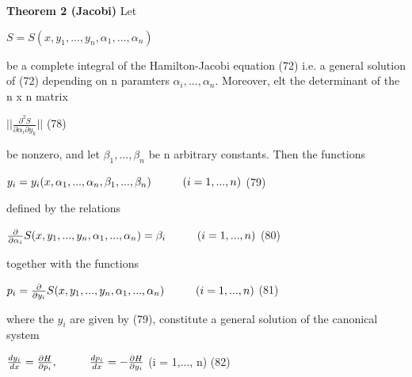 \documentclass{article}
\newcommand\tab[1][1cm]{\hspace*{#1}}
\begin{document}
\textbf {Theorem 2 (Jacobi)} Let
\begin{center}
$S = S(x, y_1 ,..., y_n, \alpha_1 ,..., \alpha_n)$
\end{center}
be a complete integral of the Hamilton-Jacobi equation (72) i.e. a general solution of (72) depending on n paramters $\alpha_i ,..., \alpha_n$. Moreover, elt the determinant of the n x n matrix
\begin{center}
$||\frac{\partial^2 S}{\partial \alpha_i \partial y_k} ||$ \tab (78)
\end{center}
be nonzero, and let $\beta_1 ,..., \beta_n$ be n arbitrary constants. Then the functions
\begin{center}
$y_i = y_i (x, \alpha_1 ,..., \alpha_n , \beta_1 ,..., \beta_n) \tab (i = 1,..., n)$ \tab (79)
\end{center}
defined by the relations
\begin{center}
$\frac{\partial}{\partial \alpha_i} S(x, y_1 ,..., y_n, \alpha_1 ,..., \alpha_n) = \beta_i \tab (i = 1,...,n)$ \tab (80)
\end{center}
together with the functions
\begin{center}
$p_i = \frac{\partial}{\partial y_i} S(x, y_1 ,..., y_n, \alpha_1 ,..., \alpha_n) \tab (i = 1,..., n)$ \tab (81)
\end{center}
where the $y_i$ are given by (79), constitute a general solution of the canonical system
\begin{center}
$\frac{dy_i}{dx} = \frac{\partial H}{\partial p_i}, \tab \frac{dp_i}{dx} = -\frac{\partial H}{\partial y_i}$ \tab (i = 1,..., n) \tab (82)
\end{center}
\end{document}
